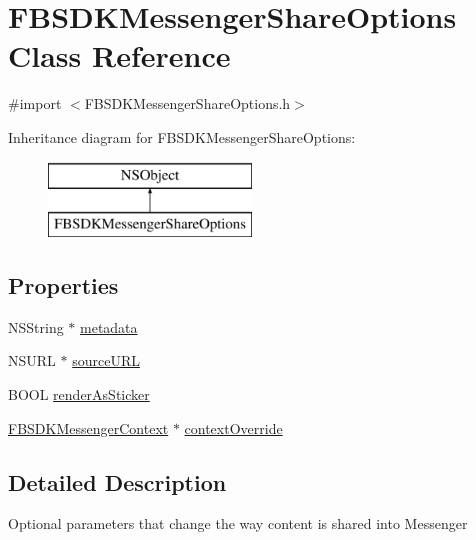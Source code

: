 \hypertarget{interface_f_b_s_d_k_messenger_share_options}{}\section{F\+B\+S\+D\+K\+Messenger\+Share\+Options Class Reference}
\label{interface_f_b_s_d_k_messenger_share_options}


{\ttfamily \#import $<$F\+B\+S\+D\+K\+Messenger\+Share\+Options.\+h$>$}

Inheritance diagram for F\+B\+S\+D\+K\+Messenger\+Share\+Options\+:\begin{figure}[H]
\begin{center}
\leavevmode
\includegraphics[height=2.000000cm]{interface_f_b_s_d_k_messenger_share_options}
\end{center}
\end{figure}
\subsection*{Properties}
\begin{DoxyCompactItemize}
\item 
N\+S\+String $\ast$ \hyperlink{interface_f_b_s_d_k_messenger_share_options_a1c26e89d9a84686394c45bafc2fbf91e}{metadata}
\item 
N\+S\+U\+R\+L $\ast$ \hyperlink{interface_f_b_s_d_k_messenger_share_options_ab571f0b042b3da2b02458b6861a8274e}{source\+U\+R\+L}
\item 
B\+O\+O\+L \hyperlink{interface_f_b_s_d_k_messenger_share_options_ab5153d3741ffa03d1222db0df759275d}{render\+As\+Sticker}
\item 
\hyperlink{interface_f_b_s_d_k_messenger_context}{F\+B\+S\+D\+K\+Messenger\+Context} $\ast$ \hyperlink{interface_f_b_s_d_k_messenger_share_options_af5f9ad68d2865fc8c803a6cf44c28a7a}{context\+Override}
\end{DoxyCompactItemize}


\subsection{Detailed Description}
Optional parameters that change the way content is shared into Messenger 

